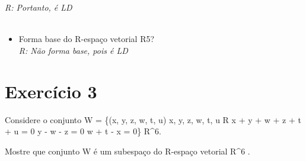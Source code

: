 \documentclass{article}
\begin{document}
\\\\\\\\\\
\begin{hbox}{

$\left[
\begin{tabular}{ccccc|c}
2 & -2 & 0 & 0 & 0 & 0\\
1 & 0 & 1 & 0 & 0 & 0\\
-1 & 1 & 0 & 0 & 0 & 0\\
0 & 0 & 0 & 1 & 0 & 0\\
0 & 0 & 0 & 0 & 1 & 0\\
\end{tabular}
\right]

$
$$\xrightarrow{l1\rightarrow 2l3-l1}
\\\\
$\left[
\begin{tabular}{ccccc|c}
0 & 0 & 0 & 0 & 0 & 0\\
1 & 0 & 1 & 0 & 0 & 0\\
-1 & 1 & 0 & 0 & 0 & 0\\
0 & 0 & 0 & 1 & 0 & 0\\
0 & 0 & 0 & 0 & 1 & 0\\
\end{tabular}
\right]\\
$
\end{hbox}\\
\\\textit{R: Portanto, é LD}\\\\
\begin{itemize}
   \item Forma base do R-espaço vetorial R5?
   \\\textit{R: Não forma base, pois é LD}
\end{itemize}



\section{Exercício 3}\label{ex3}
 Considere o conjunto W = \{(x, y, z, w, t, u) \mid  x, y, z, w, t, u \in R \land x + y + w + z + t + u = 0 \land y -  w - z = 0 \land w + t - x = 0\} \subseteq R^6. 


\item Mostre que conjunto W é um subespaço do R-espaço vetorial R^6 .
\end{document}
